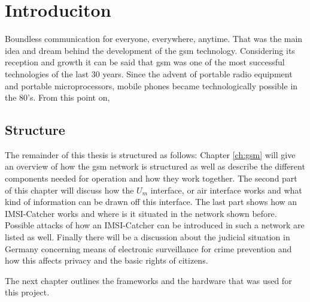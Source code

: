 \chapter{Introduciton}
Boundless communication for everyone, everywhere, anytime.
That was the main idea and dream behind the development of the \gls{gsm} technology.
Considering its reception and growth \cite{GSM2009,GSM_history2011,GSM_stats2011} it can be said that \gls{gsm} was one of the most successful technologies of the last 30 years.
Since the advent of portable radio equipment and portable microprocessors, mobile phones became technologically possible in the 80's.
From this point on, 

\section{Structure}
The remainder of this thesis is structured as follows:
Chapter \ref{ch:gsm} will give an overview of how the \gls{gsm} network is structured as well as describe the different components needed for operation and how they work together.
The second part of this chapter will discuss how the $U_m$ interface, or air interface works and what kind of information can be drawn off this interface.
The last part shows how an IMSI-Catcher works and where is it situated in the network shown before.
Possible attacks of how an IMSI-Catcher can be introduced in such a network are listed as well.
Finally there will be a discussion about the judicial situation in Germany concerning means of electronic surveillance for crime prevention and how this affects privacy and the basic rights of citizens.

The next chapter outlines the frameworks and the hardware that was used for this project.
